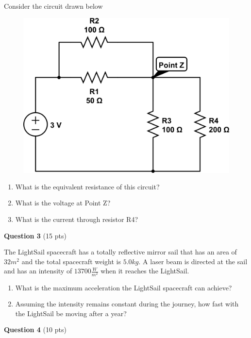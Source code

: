 \documentclass[14pt]{report}
\begin{document}
Consider the circuit drawn below

\begin{figure}[H]
\begin{center}
\includegraphics[scale=0.38]{final_2.png}
\end{center}
\end{figure}

\begin{enumerate}[label=\Alph*]
\item What is the equivalent resistance of this circuit?
\item What is the voltage at Point Z?
\item What is the current through resistor R4?
\end{enumerate}

\newpage

\textbf{Question 3} (15 pts)

The LightSail spacecraft has a totally reflective mirror sail that has an area of $32m^2$ and the total spacecraft weight is $5.0kg$. A laser beam is directed at the sail and has an intensity of $13700 \frac{W}{m^2}$ when it reaches the LightSail.

\begin{enumerate}[label=\Alph*]
\item What is the maximum acceleration the LightSail spacecraft can achieve?
\item Assuming the intensity remains constant during the journey, how fast with the LightSail be moving after a year?
\end{enumerate}

\textbf{Question 4} (10 pts)
\end{document}
